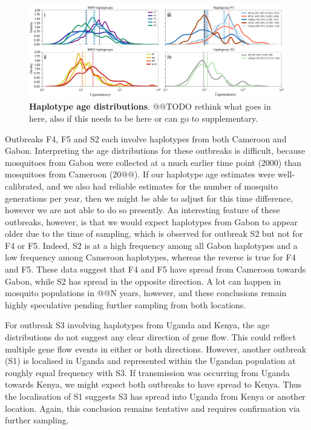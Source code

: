 \documentclass[a4paper,11pt,abstracton]{scrartcl}
\begin{document}
%
\begin{figure}[!b]
  \includegraphics[width=1.1\linewidth,center]{artwork/Figure_3_RelativeAges_tweak_final.png}
  \caption{\textbf{Haplotype age distributions}. @@TODO rethink what goes in here, also if this needs to be here or can go to supplementary.}
  \label{fig:outbreak_spread}
\end{figure}


%
Outbreaks F4, F5 and S2 each involve haplotypes from both Cameroon and Gabon.
%
Interpreting the age distributions for these outbreaks is difficult, because mosquitoes from Gabon were collected at a much earlier time point (2000) than mosquitoes from Cameroon (20@@).
%
If our haplotype age estimates were well-calibrated, and we also had reliable estimates for the number of mosquito generations per year, then we might be able to adjust for this time difference, however we are not able to do so presently.
%
An interesting feature of these outbreaks, however, is that we would expect haplotypes from Gabon to appear older due to the time of sampling, which is observed for outbreak S2 but not for F4 or F5.
%
Indeed, S2 is at a high frequency among all Gabon haplotypes and a low frequency among Cameroon haplotypes, whereas the reverse is true for F4 and F5.
%
These data suggest that F4 and F5 have spread from Cameroon towards Gabon, while S2 has spread in the opposite direction.
%
A lot can happen in mosquito populations in @@N years, however, and these conclusions remain highly speculative pending further sampling from both locations. 
%


%
For outbreak S3 involving haplotypes from Uganda and Kenya, the age distributions do not suggest any clear direction of gene flow.
%
This could reflect multiple gene flow events in either or both directions.
%
However, another outbreak (S1) is localised in Uganda and represented within the Ugandan population at roughly equal frequency with S3.
%
If transmission was occurring from Uganda towards Kenya, we might expect both outbreaks to have spread to Kenya.
%
Thus the localisation of S1 suggests S3 has spread into Uganda from Kenya or another location.
%
Again, this conclusion remains tentative and requires confirmation via further sampling.
\end{document}
